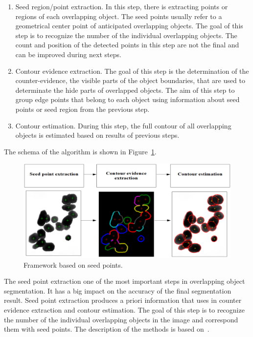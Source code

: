 \documentclass{lutmscthesis}[2010/09/22]
\begin{document}
\begin{enumerate}
\item Seed region/point extraction. In this step, there is extracting points or regions of each overlapping object. The seed points usually refer to a geometrical center point of anticipated overlapping objects. The goal of this step is to recognize the number of the individual overlapping objects. The count and position of the detected points in this step are not the final and can be improved during next steps.
\item Contour evidence extraction. The goal of this step is the determination of the counter-evidence, the visible parts of the object boundaries, that are used to determinate the hide parts of overlapped objects. The aim of this step to group edge points that belong to each object using information about seed points or seed region from the previous step.
\item Contour estimation. During this step, the full contour of all overlapping objects is estimated based on results of previous steps.
\end{enumerate}


The schema of the algorithm is shown in Figure~\ref{fig:general_framework}.

\begin{figure}[ht]
  \includegraphics[width=\linewidth]{General_framework.png}
  \caption{Framework based on seed points.~\cite{zafari-thesis}}
  \label{fig:general_framework}
\end{figure}

The seed point extraction one of the most important steps in overlapping object segmentation. It has a big impact on the accuracy of the final segmentation result. Seed point extraction produces a priori information that uses in counter evidence extraction and contour estimation. The goal of this step is to recognize the number of the individual overlapping objects in the image and correspond them with seed points. The description of the methods is based on~\cite{zafari-thesis}.
\end{document}
